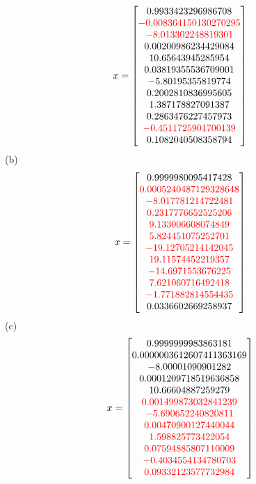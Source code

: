 \documentclass{article}
\begin{document}
\[x=\begin{bmatrix}0.9933423296986708\\ \textcolor{red}{-0.008364150130270295}\\ \textcolor{red}{-8.013302248819301}\\ 0.00200986234429084\\ 10.65643945285954\\ 0.03819355536709001\\ -5.80195355819774\\ 0.2002810836995605\\ 1.387178827091387\\ 0.2863476227457973\\ \textcolor{red}{-0.4511725901700139}\\ 0.1082040508358794\end{bmatrix}\]
(b)\[x=\begin{bmatrix} 0.9999980095417428\\ \textcolor{red}{0.0005240487129328648}\\ \textcolor{red}{-8.017781214722481}\\ \textcolor{red}{0.2317776652525206}\\ \textcolor{red}{9.133006608074849}\\ \textcolor{red}{5.824451075252701}\\ \textcolor{red}{-19.12705214142045}\\ \textcolor{red}{19.11574452219357}\\ \textcolor{red}{-14.6971553676225}\\ \textcolor{red}{7.621060716492418}\\ \textcolor{red}{-1.771882814554435}\\ 0.0336602669258937 \end{bmatrix}\]
(c)\[x=\begin{bmatrix} 0.9999999983863181\\ 0.0000003612607411363169\\ -8.00001090901282\\ 0.0001209718519636858\\ 10.66604887259279\\ \textcolor{red}{0.001499873032841239}\\ \textcolor{red}{-5.690652240820811}\\ \textcolor{red}{0.00470900127440044}\\\textcolor{red}{1.598825773422054}\\ \textcolor{red}{0.07594885807110009}\\\textcolor{red}{ -0.4034554134780703}\\ \textcolor{red}{0.09332123577732984} \end{bmatrix}
\]
\end{document}
